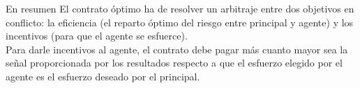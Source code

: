 \begin{frame}{En resumen}
	El contrato óptimo ha de resolver un arbitraje entre dos objetivos en conflicto: la eficiencia (el reparto óptimo del riesgo entre principal y agente) y los incentivos (para que el agente se esfuerce).\\[0.3cm]
	Para darle incentivos al agente, el contrato debe pagar más cuanto mayor sea la señal proporcionada por los resultados respecto a que el esfuerzo elegido por el agente es el esfuerzo deseado por el principal.
\end{frame}